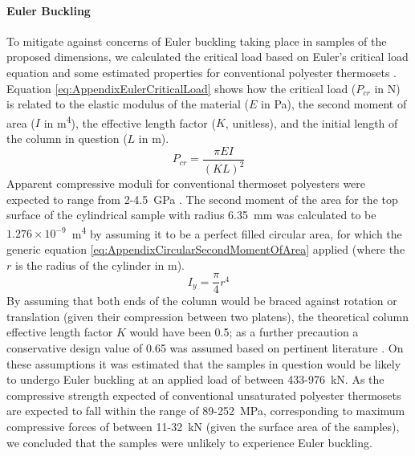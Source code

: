 \paragraph{Euler Buckling}
To mitigate against concerns of Euler buckling taking place in samples of
 the proposed dimensions, we calculated the critical load based on
 Euler's critical load equation and some estimated properties for
 conventional polyester thermosets \autocite{Euler1744}.
Equation \ref{eq:AppendixEulerCriticalLoad} shows how the critical load 
 (\(P_{cr}\) in \unit{\newton}) is related to the elastic modulus of the
 material (\(E\) in \unit{\pascal}), the second moment of area (\(I\) in
 \unit{\metre^{4}}),
 the effective length factor (\(K\), unitless), and the initial length of
 the column in question (\(L\) in \unit{\metre}).
\begin{equation}\label{eq:AppendixEulerCriticalLoad}
    P_{cr}=\frac{\pi EI}{(KL)^2}
\end{equation}
Apparent compressive moduli for conventional thermoset polyesters were expected to range
 from 2-4.5~\unit{\giga\pascal} \autocite{Lawrence1960}.
The second moment of the area for the top surface of the cylindrical sample
 with radius 6.35~\unit{\milli\metre} was calculated to be
 \(1.276\times10^{-9}\)~\unit{\metre^{4}} by assuming it to be a perfect
 filled circular area, for which the generic equation
 \ref{eq:AppendixCircularSecondMomentOfArea} applied (where the \(r\) is the
 radius of the cylinder in \unit{\metre}).
\begin{equation}\label{eq:AppendixCircularSecondMomentOfArea}
    I_{y}=\frac{\pi}{4}r^{4}
\end{equation}
By assuming that both ends of the column would be braced against rotation
 or translation (given their compression between two platens), the
 theoretical column effective length factor \(K\) would have been 0.5; as a
 further precaution a conservative design value of 0.65 was assumed
 based on pertinent literature \autocite{AISC1989}.
On these assumptions it was estimated that the samples in question would
 be likely to undergo Euler buckling at an applied load of between 
 433-976~\unit{\kilo\newton}.
As the compressive strength expected of conventional unsaturated
 polyester thermosets are expected to fall within the range of
 89-252~\unit{\mega\pascal}, corresponding to maximum compressive
 forces of between 11-32~\unit{\kilo\newton} (given the surface area of
 the samples), we concluded that the samples were unlikely to
 experience Euler buckling.

